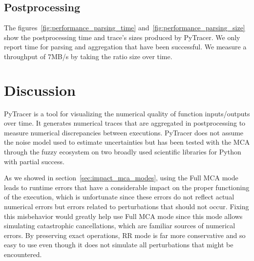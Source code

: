 \documentclass[11pt]{article}
\newcommand{\pytracer}[0]{PyTracer\xspace}
\begin{document}

\subsection{Postprocessing}

The figures~\ref{fig:performance_parsing_time} and~\ref{fig:performance_parsing_size} show
the postprocessing time and trace's sizes produced by \pytracer.
We only report time for parsing and aggregation that have been successful.
We measure a throughput of 7MB/s by taking the ratio size over time. 


\section{Discussion}

\pytracer is a tool for visualizing the numerical quality of function inputs/outputs over time.
It generates numerical traces that are aggregated in postprocessing to measure numerical discrepancies between executions.
\pytracer does not assume the noise model used to estimate uncertainties but has been tested with the MCA 
through the fuzzy ecosystem on two broadly used scientific libraries for Python with partial success.

As we showed in section~\ref{sec:impact_mca_modes}, using the Full MCA mode leads to runtime errors that have a considerable impact on the proper functioning of the execution, which is unfortunate since these
errors do not reflect actual numerical errors but errors related to perturbations that should not occur.
Fixing this misbehavior would greatly help use Full MCA mode since this mode allows simulating catastrophic cancellations, which are familiar sources of numerical errors. By preserving exact operations, RR mode is far more conservative and so easy to use even though it does not simulate all perturbations that might be encountered.
\end{document}
